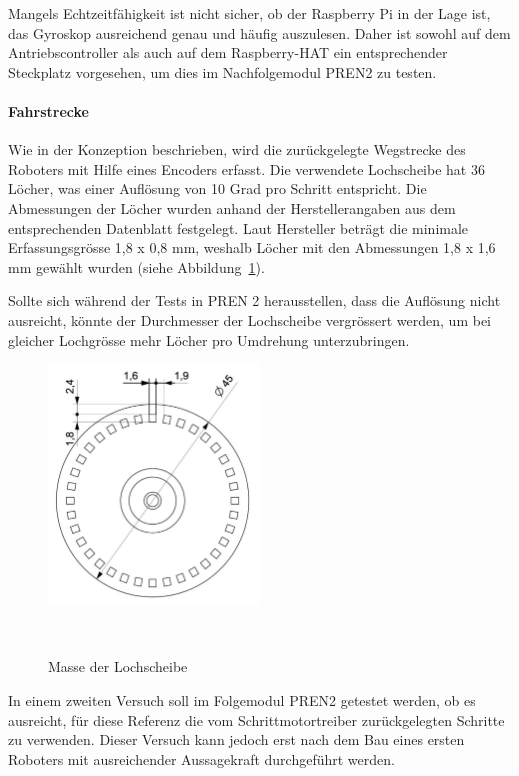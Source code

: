 \documentclass[main.tex]{subfiles} %
\begin{document}
Mangels Echtzeitfähigkeit ist nicht sicher, ob der Raspberry Pi in der Lage
ist, das Gyroskop ausreichend genau und häufig auszulesen. Daher ist sowohl auf
dem Antriebscontroller als auch auf dem Raspberry-HAT ein entsprechender
Steckplatz vorgesehen, um dies im Nachfolgemodul PREN2 zu testen.

\paragraph{Fahrstrecke} Wie in der Konzeption beschrieben, wird die zurückgelegte Wegstrecke des
Roboters mit Hilfe eines Encoders erfasst. Die verwendete Lochscheibe hat 36
Löcher, was einer Auflösung von 10 Grad pro Schritt entspricht. Die Abmessungen
der Löcher wurden anhand der Herstellerangaben aus dem entsprechenden
Datenblatt festgelegt. Laut Hersteller beträgt die minimale Erfassungsgrösse
1,8 x 0,8 mm, weshalb Löcher mit den Abmessungen 1,8 x 1,6 mm gewählt wurden
(siehe Abbildung~\ref{fig:Lochscheibe_Vermasst}).

Sollte sich während der Tests in PREN 2 herausstellen, dass die Auflösung nicht
ausreicht, könnte der Durchmesser der Lochscheibe vergrössert werden, um bei
gleicher Lochgrösse mehr Löcher pro Umdrehung unterzubringen.

\begin{figure}[H]
    \centering
    \includegraphics[width=0.5\textwidth]{./fig_Strecke_Tracken/Encoderscheibe_Vermasst.pdf}
    \caption{Masse der Lochscheibe}~\label{fig:Lochscheibe_Vermasst}
\end{figure}

In einem zweiten Versuch soll im Folgemodul PREN2 getestet werden, ob es
ausreicht, für diese Referenz die vom Schrittmotortreiber zurückgelegten
Schritte zu verwenden. Dieser Versuch kann jedoch erst nach dem Bau eines
ersten Roboters mit ausreichender Aussagekraft durchgeführt werden.
\end{document}
